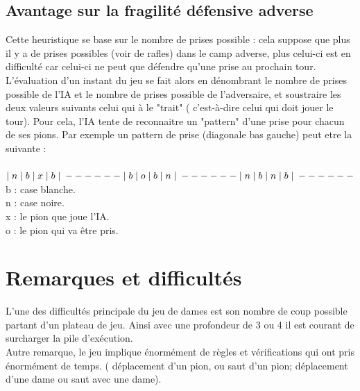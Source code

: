 \documentclass[10pt,a4paper]{report}
\begin{document}
	\subsection{Avantage sur la fragilité défensive adverse }
	Cette heuristique se base sur le nombre de prises possible : cela suppose que plus il y a de prises possibles (voir de rafles) dans le camp adverse, plus celui-ci est en difficulté car celui-ci ne peut que défendre qu'une prise au prochain tour.\\
	L'évaluation d'un instant du jeu se fait alors en dénombrant le nombre de prises possible de l'IA et le nombre de prises possible de l'adversaire, et soustraire les deux valeurs suivants celui qui à le "trait" ( c'est-à-dire celui qui doit jouer le tour).
	Pour cela, l'IA tente de reconnaitre un "pattern" d'une prise pour chacun de ses pions. Par exemple un pattern de prise (diagonale bas gauche) peut etre la suivante :\\
	\\
	$\mid n \mid b \mid x \mid b \mid\\
	------\\
	\mid b \mid o \mid b \mid n \mid\\
	------\\
	\mid n \mid b \mid n \mid b \mid\\
	------\\ $
	\\
	b : case blanche.\\
	n : case noire.\\
	x : le pion que joue l'IA.\\
	o : le pion qui va être pris.\\
\section{Remarques et difficultés}

L'une des difficultés principale du jeu de dames est son nombre de coup possible partant d'un plateau de jeu. Ainsi avec une profondeur de 3 ou 4 il est courant de surcharger la pile d'exécution. \\

Autre remarque, le jeu implique énormément de règles et vérifications qui ont pris énormément de temps.
( déplacement d'un pion, ou saut d'un pion; déplacement d'une dame ou saut avec une dame). \\
\end{document}
